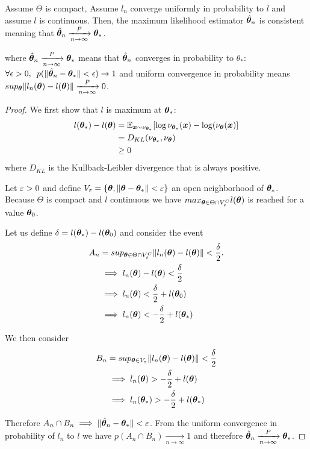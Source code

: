\begin{prop}
  \label{prop:mse_consistent}
  Assume $\Theta$ is compact, 
  Assume $l_n$ converge uniformly in probability to $l$
  and assume $l$ is continuous.
  Then, the maximum likelihood estimator  $\hat{\boldsymbol{\theta}}_n$ is consistent
  meaning that $\hat{\boldsymbol{\theta}}_n \xrightarrow[n \rightarrow \infty]{P}  \boldsymbol{\theta}_*$.
\end{prop}
where $\hat{\boldsymbol{\theta}}_n \xrightarrow[n \rightarrow \infty]{P}  \boldsymbol{\theta}_*$ means
that $\hat{\boldsymbol{\theta}}_n$ converges in probability to $\theta_*$:  $\forall \epsilon > 0, \enspace p(\| \hat{\boldsymbol{\theta}}_n - \boldsymbol{\theta}_* \| < \epsilon) \rightarrow 1$
and uniform convergence in probability means $sup_{\boldsymbol{\theta}} \|l_n(\boldsymbol{\theta}) -
l(\boldsymbol{\theta})\| \xrightarrow[n \rightarrow \infty]{P} 0$.
\begin{proof}
  We first show that $l$ is maximum at $\boldsymbol{\theta}_*$:
  \begin{align}
    l(\boldsymbol{\theta}_*) - l(\boldsymbol{\theta}) &= \mathbb{E}_{\boldsymbol{x} \sim \nu_{\boldsymbol{\theta}_*}}[\log \nu_{\boldsymbol{\theta}_*}(\boldsymbol{x}) - \log(\nu_{\boldsymbol{\theta}}(\boldsymbol{x})] \\
                            &= D_{KL}(\nu_{\boldsymbol{\theta}_*}, \nu_{\boldsymbol{\theta}}) \\ \label{kl-likelihood}
                            &\geq 0
  \end{align}
  where $D_{KL}$ is the Kullback-Leibler divergence that is always positive.

  Let $\varepsilon > 0$ and define $V_{\varepsilon} = \{\boldsymbol{\theta}, \|\boldsymbol{\theta} - \boldsymbol{\theta}_*\| <
  \varepsilon\}$ an open neighborhood of $\boldsymbol{\theta}_*$.
  Because $\Theta$ is compact and $l$ continuous we have $max_{\boldsymbol{\theta} \in \Theta
    \cap V_{\varepsilon}^C} l(\boldsymbol{\theta})$ is reached for a value $\boldsymbol{\theta}_0$.
  
  Let us define $\delta = l(\boldsymbol{\theta}_*) - l(\boldsymbol{\theta}_0)$ and consider the event
  \begin{align}
    A_n &= sup_{\boldsymbol{\theta} \in \Theta \cap V_{\varepsilon}^C} \|l_n(\boldsymbol{\theta}) - l(\boldsymbol{\theta})\| < \frac{\delta}{2}. \\
    &\implies l_n(\boldsymbol{\theta}) - l(\boldsymbol{\theta}) < \frac{\delta}{2} \\
    &\implies l_n(\boldsymbol{\theta}) < \frac{\delta}{2} + l(\boldsymbol{\theta}_0) \\
    &\implies l_n(\boldsymbol{\theta}) < -\frac{\delta}{2} + l(\boldsymbol{\theta}_*)
  \end{align}

  We then consider 
  \begin{align}
    B_n &= sup_{\boldsymbol{\theta} \in V_{\varepsilon}} \|l_n(\boldsymbol{\theta}) - l(\boldsymbol{\theta})\| < \frac{\delta}{2} \\
        &\implies l_n(\boldsymbol{\theta}) > -\frac{\delta}{2} + l(\boldsymbol{\theta}) \\
        &\implies l_n(\boldsymbol{\theta}_*) > -\frac{\delta}{2} + l(\boldsymbol{\theta}_*) \\
  \end{align}

  Therefore $A_n \cap B_n \implies \|\hat{\boldsymbol{\theta}}_n - \boldsymbol{\theta}_* \| < \varepsilon$.
  From the uniform convergence in probability of $l_n$ to $l$ we have
  $p(A_n \cap B_n) \xrightarrow[n \rightarrow \infty]{} 1$ and therefore $\hat{\boldsymbol{\theta}}_n \xrightarrow[n \rightarrow \infty]{P} \boldsymbol{\theta}_*$.
\end{proof}

